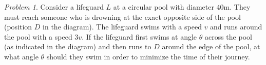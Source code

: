 \documentclass[11pt,twoside]{amsart}
\theoremstyle{plain}
\theoremstyle{remark}
\newtheorem{prob}{Problem}
\theoremstyle{definition}
\theoremstyle{definition}
\begin{document}
\begin{prob}
Consider a lifeguard $L$ at a circular pool with diameter $40$m. They must reach someone who is drowning at the exact opposite side of the pool (position $D$ in the diagram). The lifeguard swims with a speed $v$ and runs around the pool with a speed $3v$. If the lifeguard first swims at angle $\theta$ across the pool (as indicated in the diagram) and then runs to $D$ around the edge of the pool, at what angle $\theta$ should they swim in order to minimize the time of their journey.

\begin{center}
\end{center}
\end{prob}
\end{document}
